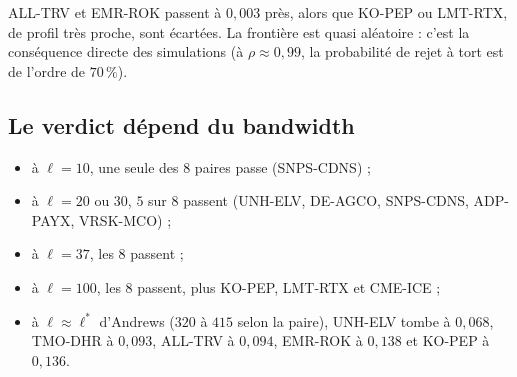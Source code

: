\documentclass[11pt,a4paper]{article}
\theoremstyle{definition}
\begin{document}
ALL-TRV et EMR-ROK passent à $0{,}003$ près, alors que KO-PEP ou LMT-RTX, de profil très proche, sont écartées. La frontière est quasi aléatoire : c'est la conséquence directe des simulations (à $\rho \approx 0{,}99$, la probabilité de rejet à tort est de l'ordre de $70\,\%$).

\subsection{Le verdict dépend du bandwidth}

\begin{itemize}
\item à $\ell = 10$, une seule des $8$ paires passe (SNPS-CDNS) ;
\item à $\ell = 20$ ou $30$, $5$ sur $8$ passent (UNH-ELV, DE-AGCO, SNPS-CDNS, ADP-PAYX, VRSK-MCO) ;
\item à $\ell = 37$, les $8$ passent ;
\item à $\ell = 100$, les $8$ passent, plus KO-PEP, LMT-RTX et CME-ICE ;
\item à $\ell \approx \ell^*$ d'Andrews ($320$ à $415$ selon la paire), UNH-ELV tombe à $0{,}068$, TMO-DHR à $0{,}093$, ALL-TRV à $0{,}094$, EMR-ROK à $0{,}138$ et KO-PEP à $0{,}136$.
\end{itemize}
\end{document}
